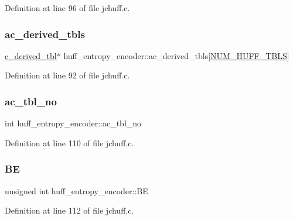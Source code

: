 Definition at line 96 of file jchuff.\+c.

\mbox{\label{structhuff__entropy__encoder_a0b67beb3a73da24b5d09693f3c0c8b22}} 
\subsubsection{\texorpdfstring{ac\_derived\_tbls}{ac\_derived\_tbls}}
{\footnotesize\ttfamily \mbox{\hyperlink{structc__derived__tbl}{c\+\_\+derived\+\_\+tbl}}$\ast$ huff\+\_\+entropy\+\_\+encoder\+::ac\+\_\+derived\+\_\+tbls\mbox{[}\mbox{\hyperlink{jpeglib_8h_a6b12985705944e0623b671f29dc5722e}{N\+U\+M\+\_\+\+H\+U\+F\+F\+\_\+\+T\+B\+LS}}\mbox{]}}



Definition at line 92 of file jchuff.\+c.

\mbox{\label{structhuff__entropy__encoder_a43f8a73e36740cd79fde6e45efef6d16}} 
\subsubsection{\texorpdfstring{ac\_tbl\_no}{ac\_tbl\_no}}
{\footnotesize\ttfamily int huff\+\_\+entropy\+\_\+encoder\+::ac\+\_\+tbl\+\_\+no}



Definition at line 110 of file jchuff.\+c.

\mbox{\label{structhuff__entropy__encoder_a60927ee1fdfb068cb003c17587770a2b}} 
\subsubsection{\texorpdfstring{BE}{BE}}
{\footnotesize\ttfamily unsigned int huff\+\_\+entropy\+\_\+encoder\+::\+BE}



Definition at line 112 of file jchuff.\+c.

